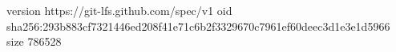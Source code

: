 version https://git-lfs.github.com/spec/v1
oid sha256:293b883cf7321446ed208f41e71c6b2f3329670c7961ef60deec3d1e3e1d5966
size 786528
